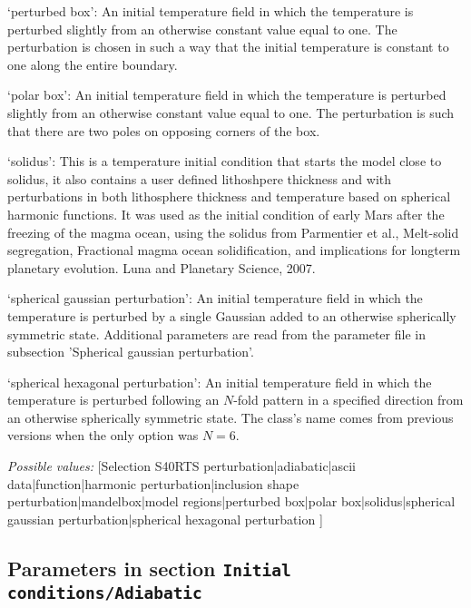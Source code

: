 \begin{itemize}
`perturbed box': An initial temperature field in which the temperature is perturbed slightly from an otherwise constant value equal to one. The perturbation is chosen in such a way that the initial temperature is constant to one along the entire boundary.

`polar box': An initial temperature field in which the temperature is perturbed slightly from an otherwise constant value equal to one. The perturbation is such that there are two poles on opposing corners of the box. 

`solidus': This is a temperature initial condition that starts the model close to solidus, it also contains a user defined lithoshpere thickness and with perturbations  in both lithosphere thickness and temperature based on spherical harmonic functions. It was used as the initial condition of early Mars after the freezing of the magma ocean, using the solidus from Parmentier et al., Melt-solid segregation, Fractional magma ocean solidification, and implications for longterm planetary evolution. Luna and Planetary Science, 2007.

`spherical gaussian perturbation': An initial temperature field in which the temperature is perturbed by a single Gaussian added to an otherwise spherically symmetric state. Additional parameters are read from the parameter file in subsection 'Spherical gaussian perturbation'.

`spherical hexagonal perturbation': An initial temperature field in which the temperature is perturbed following an $N$-fold pattern in a specified direction from an otherwise spherically symmetric state. The class's name comes from previous versions when the only option was $N=6$.


{\it Possible values:} [Selection S40RTS perturbation|adiabatic|ascii data|function|harmonic perturbation|inclusion shape perturbation|mandelbox|model regions|perturbed box|polar box|solidus|spherical gaussian perturbation|spherical hexagonal perturbation ]
\end{itemize}



\subsection{Parameters in section \tt Initial conditions/Adiabatic}
\label{parameters:Initial_20conditions/Adiabatic}

